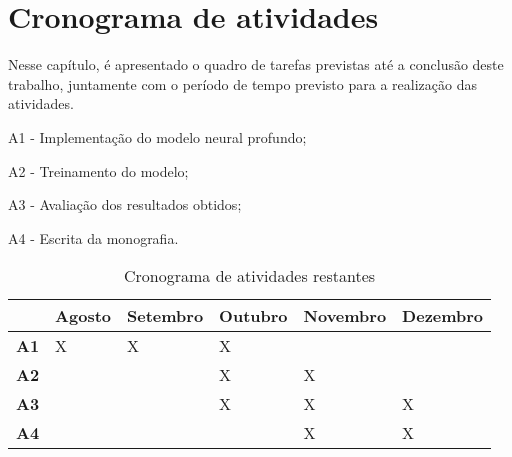 \chapter{Cronograma de atividades}\label{cronograma}

Nesse capítulo, é apresentado o quadro de tarefas previstas até a conclusão deste
trabalho, juntamente com o período de tempo previsto para a realização das atividades.

A1 - Implementação do modelo neural profundo;

A2 - Treinamento do modelo;

A3 - Avaliação dos resultados obtidos;

A4 - Escrita da monografia.

\begin{table}[!htb]
\footnotesize
\centering
\caption{Cronograma de atividades restantes}
\label{tab:cronogramaativs}
\begin{tabular}{P{1cm}P{2cm}P{2cm}P{2cm}P{2cm}P{2cm}}
  \toprule
  & \textbf{Agosto} & \textbf{Setembro}  & \textbf{Outubro}  & \textbf{Novembro} & \textbf{Dezembro}  \\
  \midrule
  \textbf{A1} & X & X & X &   &   \\
  \textbf{A2} &   &   & X & X &   \\
  \textbf{A3} &   &   & X & X & X \\
  \textbf{A4} &   &   &   & X & X \\
  \bottomrule
\end{tabular}
\end{table}
